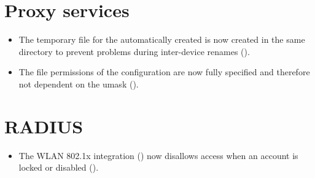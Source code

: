 \section{Proxy services}
\begin{itemize}
\item The temporary file for the automatically created  is now created in the same directory to prevent problems during inter-device renames ().
\item The file permissions of the  configuration are now fully specified and therefore not dependent on the umask ().
\end{itemize}

\section{RADIUS}
\begin{itemize}
\item The WLAN 802.1x integration () now disallows access when an account is locked or disabled ().
\end{itemize}

%

%
%

%


